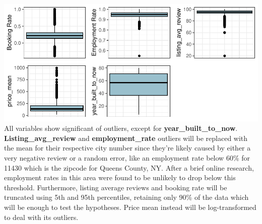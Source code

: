 \documentclass[
  12pt,
]{article}
\begin{document}
\includegraphics{assignment2_final_2_files/figure-latex/unnamed-chunk-6-1.pdf}
All variables show significant of outliers, except for
\textbf{year\_built\_to\_now}. \textbf{Listing\_avg\_review} and
\textbf{employment\_rate} outliers will be replaced with the mean for
their respective city number since they're likely caused by either a
very negative review or a random error, like an employment rate below
60\% for 11430 which is the zipcode for Queens County, NY. After a brief
online research, employment rates in this area were found to be unlikely
to drop below this threshold. Furthermore, listing average reviews and
booking rate will be truncated using 5th and 95th percentiles, retaining
only 90\% of the data which will be enough to test the hypotheses. Price
mean instead will be log-transformed to deal with its outliers.
\end{document}
